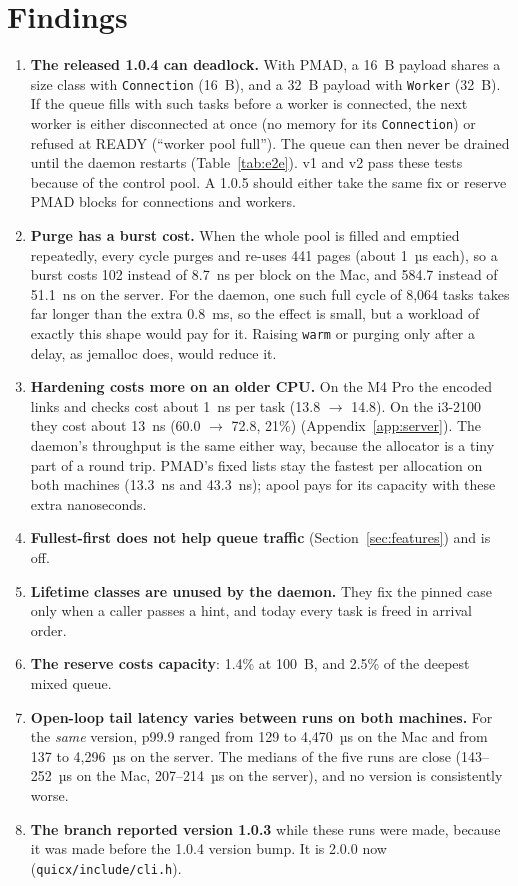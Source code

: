 \documentclass[10.5pt,a4paper]{article}
\newcommand{\file}[1]{\texttt{\small #1}}
\begin{document}
\section{Findings}\label{sec:findings}

\begin{enumerate}
  \item \textbf{The released 1.0.4 can deadlock.} With PMAD, a 16~B payload shares a size class with \texttt{Connection} (16~B), and a 32~B payload with \texttt{Worker} (32~B). If the queue fills with such tasks before a worker is connected, the next worker is either disconnected at once (no memory for its \texttt{Connection}) or refused at READY (``worker pool full''). The queue can then never be drained until the daemon restarts (Table~\ref{tab:e2e}). v1 and v2 pass these tests because of the control pool. A 1.0.5 should either take the same fix or reserve PMAD blocks for connections and workers.
  \item \textbf{Purge has a burst cost.} When the whole pool is filled and emptied repeatedly, every cycle purges and re-uses 441 pages (about 1~µs each), so a burst costs 102 instead of 8.7~ns per block on the Mac, and 584.7 instead of 51.1~ns on the server. For the daemon, one such full cycle of 8,064 tasks takes far longer than the extra 0.8~ms, so the effect is small, but a workload of exactly this shape would pay for it. Raising \texttt{warm} or purging only after a delay, as jemalloc does, would reduce it.
  \item \textbf{Hardening costs more on an older CPU.} On the M4 Pro the encoded links and checks cost about 1~ns per task (13.8 $\to$ 14.8). On the i3-2100 they cost about 13~ns (60.0 $\to$ 72.8, 21\%) (Appendix~\ref{app:server}). The daemon's throughput is the same either way, because the allocator is a tiny part of a round trip. PMAD's fixed lists stay the fastest per allocation on both machines (13.3~ns and 43.3~ns); apool pays for its capacity with these extra nanoseconds.
  \item \textbf{Fullest-first does not help queue traffic} (Section~\ref{sec:features}) and is off.
  \item \textbf{Lifetime classes are unused by the daemon.} They fix the pinned case only when a caller passes a hint, and today every task is freed in arrival order.
  \item \textbf{The reserve costs capacity}: 1.4\% at 100~B, and 2.5\% of the deepest mixed queue.
  \item \textbf{Open-loop tail latency varies between runs on both machines.} For the \emph{same} version, p99.9 ranged from 129 to 4,470~µs on the Mac and from 137 to 4,296~µs on the server. The medians of the five runs are close (143--252~µs on the Mac, 207--214~µs on the server), and no version is consistently worse.
  \item \textbf{The branch reported version 1.0.3} while these runs were made, because it was made before the 1.0.4 version bump. It is 2.0.0 now (\file{quicx/include/cli.h}).
\end{enumerate}
\end{document}
